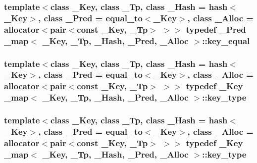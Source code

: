 \subsubsection[{key\+\_\+equal}]{\setlength{\rightskip}{0pt plus 5cm}template$<$class \+\_\+\+Key, class \+\_\+\+Tp, class \+\_\+\+Hash = hash$<$\+\_\+\+Key$>$, class \+\_\+\+Pred = equal\+\_\+to$<$\+\_\+\+Key$>$, class \+\_\+\+Alloc = allocator$<$pair$<$const \+\_\+\+Key, \+\_\+\+Tp$>$ $>$$>$ typedef \+\_\+\+Pred {\bf \+\_\+map}$<$ \+\_\+\+Key, \+\_\+\+Tp, \+\_\+\+Hash, \+\_\+\+Pred, \+\_\+\+Alloc $>$\+::{\bf key\+\_\+equal}}\label{class__map_ac341e21272b7041e034855227f1cce49}
\hypertarget{class__map_a38e77c21e3aba60e817666c55ff61164}{}
\subsubsection[{key\+\_\+type}]{\setlength{\rightskip}{0pt plus 5cm}template$<$class \+\_\+\+Key, class \+\_\+\+Tp, class \+\_\+\+Hash = hash$<$\+\_\+\+Key$>$, class \+\_\+\+Pred = equal\+\_\+to$<$\+\_\+\+Key$>$, class \+\_\+\+Alloc = allocator$<$pair$<$const \+\_\+\+Key, \+\_\+\+Tp$>$ $>$$>$ typedef \+\_\+\+Key {\bf \+\_\+map}$<$ \+\_\+\+Key, \+\_\+\+Tp, \+\_\+\+Hash, \+\_\+\+Pred, \+\_\+\+Alloc $>$\+::{\bf key\+\_\+type}}\label{class__map_a38e77c21e3aba60e817666c55ff61164}
\hypertarget{class__map_a38e77c21e3aba60e817666c55ff61164}{}
\subsubsection[{key\+\_\+type}]{\setlength{\rightskip}{0pt plus 5cm}template$<$class \+\_\+\+Key, class \+\_\+\+Tp, class \+\_\+\+Hash = hash$<$\+\_\+\+Key$>$, class \+\_\+\+Pred = equal\+\_\+to$<$\+\_\+\+Key$>$, class \+\_\+\+Alloc = allocator$<$pair$<$const \+\_\+\+Key, \+\_\+\+Tp$>$ $>$$>$ typedef \+\_\+\+Key {\bf \+\_\+map}$<$ \+\_\+\+Key, \+\_\+\+Tp, \+\_\+\+Hash, \+\_\+\+Pred, \+\_\+\+Alloc $>$\+::{\bf key\+\_\+type}}\label{class__map_a38e77c21e3aba60e817666c55ff61164}
\hypertarget{class__map_a715fe122a46eecc92c19958b56ed91e4}{}
